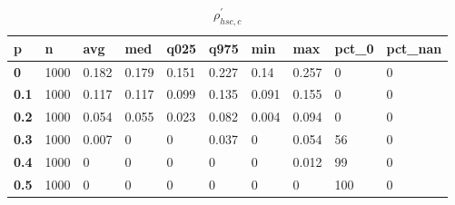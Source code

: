 \begin{table}[h]
 \centering 
\footnotesize
\caption{$\rho_{hsc,c}^\prime $}
\label{tab:alphahscc}
\begin{tabular}[h]{|l|l|l|l|l|l|l|l|l|l|
    } \hline
\textbf{ p} & \textbf{ n} & \textbf{ avg} & \textbf{ med} & \textbf{ q025} & \textbf{ q975} & \textbf{ min} & \textbf{ max} & \textbf{ pct\_0} & \textbf{ pct\_nan}
    \\ \hline
  \textbf{  0} & 1000 & 0.182 & 0.179 & 0.151 & 0.227 &  0.14 & 0.257 &   0 & 0
    \\ \hline
  \textbf{0.1} & 1000 & 0.117 & 0.117 & 0.099 & 0.135 & 0.091 & 0.155 &   0 & 0
    \\ \hline
  \textbf{0.2} & 1000 & 0.054 & 0.055 & 0.023 & 0.082 & 0.004 & 0.094 &   0 & 0
    \\ \hline
  \textbf{0.3} & 1000 & 0.007 &     0 &     0 & 0.037 &     0 & 0.054 &  56 & 0
    \\ \hline
  \textbf{0.4} & 1000 &     0 &     0 &     0 &     0 &     0 & 0.012 &  99 & 0
    \\ \hline
  \textbf{0.5} & 1000 &     0 &     0 &     0 &     0 &     0 &     0 & 100 & 0
    \\ \hline
 \end{tabular}
 \end{table}
